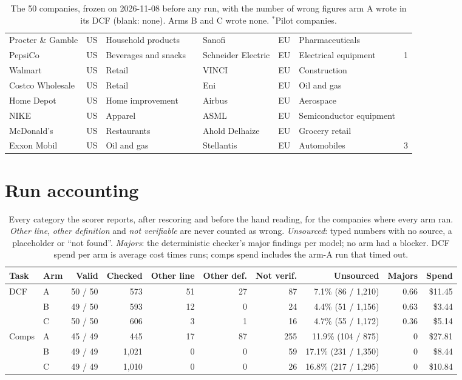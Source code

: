 \documentclass[10pt,a4paper]{article}
\begin{document}
\begin{table}[H]
\begin{tabular}{llll@{\hspace{14pt}}llll}
Procter \& Gamble & US & Household products &  & Sanofi & EU & Pharmaceuticals &  \\
PepsiCo & US & Beverages and snacks &  & Schneider Electric & EU & Electrical equipment & 1 \\
Walmart & US & Retail &  & VINCI & EU & Construction &  \\
Costco Wholesale & US & Retail &  & Eni & EU & Oil and gas &  \\
Home Depot & US & Home improvement &  & Airbus & EU & Aerospace &  \\
NIKE & US & Apparel &  & ASML & EU & Semiconductor equipment &  \\
McDonald's & US & Restaurants &  & Ahold Delhaize & EU & Grocery retail &  \\
Exxon Mobil & US & Oil and gas &  & Stellantis & EU & Automobiles & 3 \\
\bottomrule
\end{tabular}
\caption{The 50 companies, frozen on 2026-11-08 before any run, with the number of wrong figures arm A wrote in its
DCF (blank: none). Arms B and C wrote none. $^{\ast}$Pilot companies.}
\label{tab:companies}
\end{table}

\section{Run accounting}
\label{app:runs}

\begin{table}[H]
\centering
\footnotesize
\begin{tabular}{llrrrrrrrr}
\toprule
Task & Arm & Valid & Checked & Other line & Other def. & Not verif. & Unsourced & Majors & Spend \\
\midrule
DCF   & A & 50 / 50 & 573     & 51 & 27 & 87  & 7.1\% (86 / 1{,}210)   & 0.66 & \$11.45 \\
      & B & 49 / 50 & 593     & 12 & 0  & 24  & 4.4\% (51 / 1{,}156)   & 0.63 & \$3.44 \\
      & C & 50 / 50 & 606     & 3  & 1  & 16  & 4.7\% (55 / 1{,}172)   & 0.36 & \$5.14 \\
\midrule
Comps & A & 45 / 49 & 445     & 17 & 87 & 255 & 11.9\% (104 / 875)     & 0    & \$27.81 \\
      & B & 49 / 49 & 1{,}021 & 0  & 0  & 59  & 17.1\% (231 / 1{,}350) & 0    & \$8.44 \\
      & C & 49 / 49 & 1{,}010 & 0  & 0  & 26  & 16.8\% (217 / 1{,}295) & 0    & \$10.84 \\
\bottomrule
\end{tabular}
\caption{Every category the scorer reports, after rescoring and before the hand reading, for the companies where
every arm ran. \emph{Other line}, \emph{other definition} and \emph{not verifiable} are never counted as wrong.
\emph{Unsourced}: typed numbers with no source, a placeholder or ``not found''. \emph{Majors}: the deterministic
checker's major findings per model; no arm had a blocker. DCF spend per arm is average cost times runs; comps spend
includes the arm-A run that timed out.}
\label{tab:runs}
\end{table}
\end{document}
